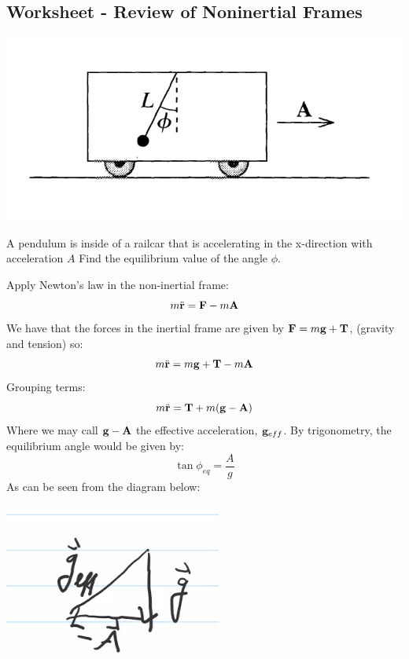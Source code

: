 \subsection{Worksheet - Review of Noninertial Frames}

\begin{center}
    \includegraphics[scale=0.5]{Lecture-14/w14-img1.png}
\end{center}

\begin{p}
A pendulum is inside of a railcar that is accelerating in the x-direction with acceleration $A$  Find the equilibrium value of the angle $\phi$. 
\end{p}
\begin{s}
Apply Newton's law in the non-inertial frame:
\[m\ddot{\mathbf{r}} = \mathbf{F} - m\mathbf{A}\]
We have that the forces in the inertial frame are given by $\mathbf{F} = m\mathbf{g} + \mathbf{T}$, (gravity and tension) so:
\[m\ddot{\mathbf{r}} = m\mathbf{g} + \mathbf{T} - m\mathbf{A}\]
Grouping terms:
\[m\ddot{\mathbf{r}} = \mathbf{T} + m(\mathbf{g} - \mathbf{A})\]
Where we may call $\mathbf{g} - \mathbf{A}$ the effective acceleration, $\mathbf{g}_{eff}$. By trigonometry, the equilibrium angle would be given by:
\[\tan\phi_{eq} = \frac{A}{g}\] As can be seen from the diagram below:
\begin{center}
    \includegraphics[scale=0.8]{Lecture-14/w14-img2.png}
\end{center}
\end{s}


